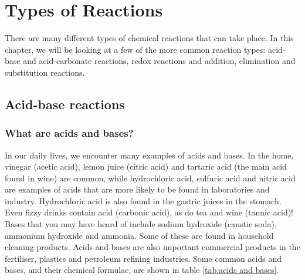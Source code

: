 \chapter{Types of Reactions}
\label{chap:reactiontypes}

There are many different types of chemical reactions that can take place. In this chapter, we will be looking at a few of the more common reaction types: acid-base and acid-carbonate reactions, redox reactions and addition, elimination and substitution reactions.



\section{Acid-base reactions}
\label{sec:reactiontypes:acid-base}

\subsection{What are acids and bases?}

In our daily lives, we encounter many examples of acids and bases. In the home, vinegar (acetic acid), lemon juice (citric acid) and tartaric acid (the main acid found in wine) are common, while hydrochloric acid, sulfuric acid and nitric acid are examples of acids that are more likely to be found in laboratories and industry. Hydrochloric acid is also found in the gastric juices in the stomach. Even fizzy drinks contain acid (carbonic acid), as do tea and wine (tannic acid)! Bases that you may have heard of include sodium hydroxide (caustic soda), ammonium hydroxide and ammonia. Some of these are found in household cleaning products. Acids and bases are also important commercial products in the fertiliser, plastics and petroleum refining industries. Some common acids and bases, and their chemical formulae, are shown in table \ref{tab:acids and bases}.

